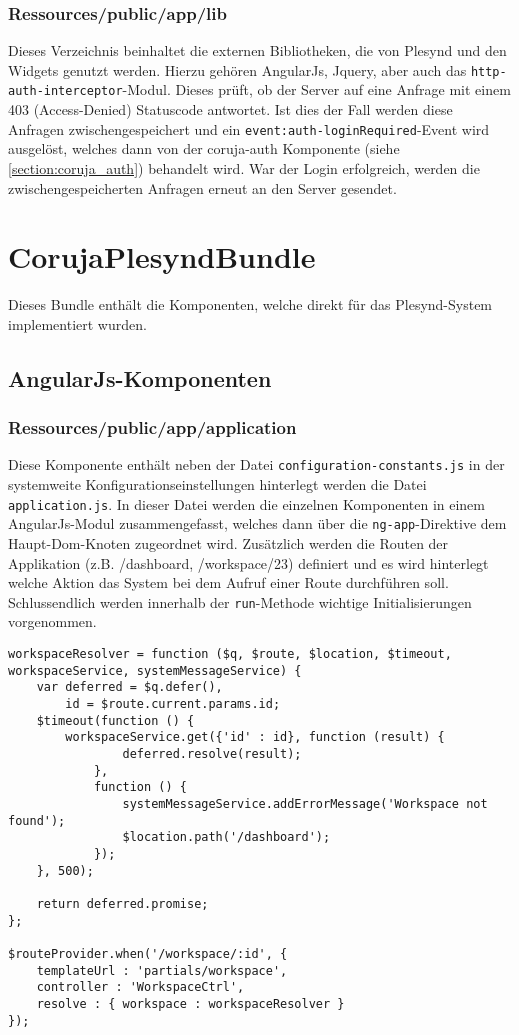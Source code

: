 \subsubsection{Ressources/public/app/lib}
Dieses Verzeichnis beinhaltet die externen Bibliotheken, die von Plesynd und den Widgets genutzt werden. Hierzu gehören AngularJs, Jquery, aber auch das \texttt{http-auth-interceptor}-Modul. Dieses prüft, ob der Server auf eine Anfrage mit einem 403 (Access-Denied) Statuscode antwortet. Ist dies der Fall werden diese Anfragen zwischengespeichert und ein \texttt{event:auth-loginRequired}-Event wird ausgelöst, welches dann von der coruja-auth Komponente (siehe \ref{section:coruja_auth}) behandelt wird. War der Login erfolgreich, werden die zwischengespeicherten Anfragen erneut an den Server gesendet. 

\section{CorujaPlesyndBundle}
Dieses Bundle enthält die Komponenten, welche direkt für das Plesynd-System implementiert wurden.

\subsection{AngularJs-Komponenten}

\subsubsection{Ressources/public/app/application}\label{section:app_application}
Diese Komponente enthält neben der Datei \texttt{configuration-constants.js} in der systemweite Konfigurationseinstellungen hinterlegt werden die Datei \texttt{application.js}. In dieser Datei werden die einzelnen Komponenten in einem AngularJs-Modul zusammengefasst, welches dann über die \texttt{ng-app}-Direktive dem Haupt-Dom-Knoten zugeordnet wird. Zusätzlich werden die Routen der Applikation (z.B. /dashboard, /workspace/23) definiert und es wird hinterlegt welche Aktion das System bei dem Aufruf einer Route durchführen soll. Schlussendlich werden innerhalb der \texttt{run}-Methode wichtige Initialisierungen vorgenommen.
\begin{lstlisting}[caption=Beispiel für die Definition einer Route und eines Resolvers]
workspaceResolver = function ($q, $route, $location, $timeout, workspaceService, systemMessageService) {
    var deferred = $q.defer(),
        id = $route.current.params.id;
    $timeout(function () {
        workspaceService.get({'id' : id}, function (result) {
                deferred.resolve(result);
            },
            function () {
                systemMessageService.addErrorMessage('Workspace not found');
                $location.path('/dashboard');
            });
    }, 500);

    return deferred.promise;
};

$routeProvider.when('/workspace/:id', {
    templateUrl : 'partials/workspace',
    controller : 'WorkspaceCtrl',
    resolve : { workspace : workspaceResolver }
});
\end{lstlisting}

